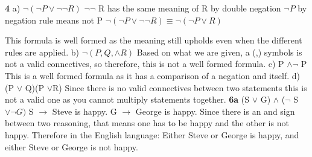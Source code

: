 \documentclass[12pt]{article}
\begin{document}
\textbf{4} 
a) $\neg (\neg P \vee \neg \neg R)$ \newline 
$\neg \neg$ R has the same meaning of R by double negation \newline 
$\neg P$ by negation rule means not P \newline 
$\neg (\neg P \vee \neg \neg R) \equiv \neg(\neg P \vee R)$  \newline 

This formula is well formed as the meaning still upholds even when the different rules are applied. \newline
b) $\neg (P,Q, \wedge R)$ \newline 
Based on what we are given, a (,) symbols is not a valid connectives, so therefore, this is not a well formed formula. \newline 
c) P $\wedge \neg$ P\newline 
This is a well formed formula as it has a comparison of a negation and itself. \newline
d) (P $\vee$ Q)(P $\vee$R) \newline 
Since there is no valid connectives between two statements this is not a valid one as you cannot multiply statements together. \newline
\vspace{0.5cm} 
\textbf{6a} (S $\vee$ G) $\wedge$ ($\neg$ S $\vee \neg G)$\newline 
S $\rightarrow$ Steve is happy. \newline 
G $\rightarrow$ George is happy. \newline 
Since there is an and sign between two reasoning, that means one has to be happy and the other is not happy. \newline 
Therefore in the English language: Either Steve or George is happy, and either Steve or George is not happy.  
\end{document}
